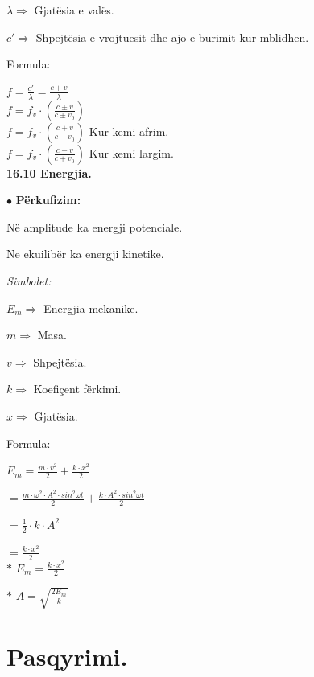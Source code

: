 \documentclass[twocolumn]{article}
\begin{document}
$\lambda \Rightarrow$ Gjatësia e valës.

$c' \Rightarrow $ Shpejtësia e vrojtuesit dhe ajo e burimit kur mblidhen.


\begin{center}
	Formula:
\end{center}

$f=\frac{c'}{\lambda}= \frac{c+v}{\lambda}$\\

$f= f_v \cdot (\frac{c \pm v}{c \pm v_0} )$\\

$f= f_v \cdot (\frac{c + v}{c - v_0} )$ Kur kemi afrim.\\

$f= f_v \cdot (\frac{c - v}{c + v_0} )$ Kur kemi largim.\\


\textbf{16.10 Energjia.}

$\bullet$ \textbf{Përkufizim:}

Në amplitude ka energji potenciale.

Ne ekuilibër ka energji kinetike.

\begin{center}
	\textit{Simbolet:}
\end{center}

$E_m \Rightarrow$ Energjia mekanike.

$m \Rightarrow $ Masa.

$v \Rightarrow$ Shpejtësia.

$k \Rightarrow$ Koefiçent fërkimi.

$x \Rightarrow$ Gjatësia.

\begin{center}
	Formula:
\end{center}

$E_m=\frac{m \cdot v^2}{2}+ \frac{k \cdot x^2}{2}$

$= \frac{m  \cdot \omega^2 \cdot A^2 \cdot sin^2 \omega t }{2} + \frac{k \cdot A^2 \cdot sin^2 \omega t}{2}$

$= \frac{1}{2}\cdot k \cdot A^2$

$=\frac{k \cdot x^2}{2}$\\

 $*$ $E_m=\frac{k \cdot x^2}{2}$


$*$ $A=\sqrt{\frac{2E_m}{k}}$


\section{Pasqyrimi.}
\end{document}
